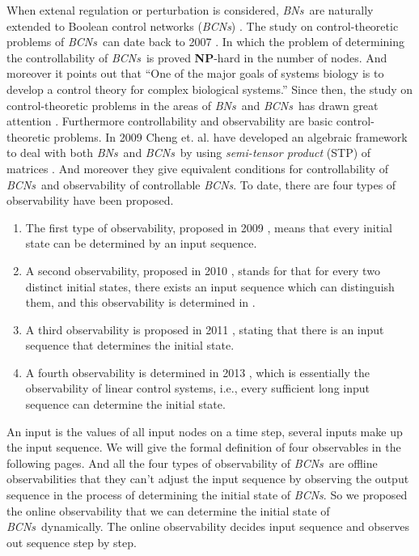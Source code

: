 \documentclass[conference]{IEEEtran} %
\def \BNs {{\em BNs}}
\def \BCNs {{\em BCNs}}
\newcommand{\rev}[1]{{\color{red}{#1}}}
\newcommand{\tl}[1]{\textcolor{blue} {TL: #1 :TL} }
\begin{document}
When extenal regulation or perturbation is considered, \BNs\ are naturally extended to Boolean control networks ({\em BCNs}) \cite{Ideker2001A}. The study on control-theoretic problems of \BCNs\ can date back to 2007 \cite{Akutsu2007Control}. In which the problem of determining the controllability of \BCNs\ is proved {\bf NP}-hard in the number of nodes. And moreover it points out that ``One of the major goals of systems biology is to develop a control theory for complex biological systems.'' Since then, the study on control-theoretic problems in the areas of \BNs\ and \BCNs\ has drawn great attention \cite{Fornasini2013Observability, Zhao2010Input, Cheng2011Identification, Cheng2011Analysis, cheng2009controllability}. Furthermore controllability and observability are basic control-theoretic problems. In 2009 Cheng et. al.   have developed an algebraic framework to deal with both \BNs\ and \BCNs\ by using \emph{semi-tensor product} (STP) of matrices \cite{cheng2009controllability}. And moreover they give equivalent conditions for controllability of \BCNs\ and observability of controllable {\em BCNs}. To date, there are four types of observability have been proposed. 

\begin{enumerate}
	\item The first type of observability, proposed in 2009 \cite{cheng2009controllability}, means that every initial state can be determined by an input sequence.
	
	\item 
	A second observability, proposed in 2010 \cite{Zhao2010Input}, stands for that for every two distinct initial states, there exists an input sequence which can distinguish them, and this observability is determined in \cite{Li2015Controllability}.
	
	\item A third observability is proposed in 2011 \cite{Cheng2011Identification}, stating that there is an input sequence that determines the initial state.
	
	\item  A fourth observability is determined in 2013 \cite{Fornasini2013Observability}, which is essentially the observability of linear control systems, i.e., every sufficient long input sequence can determine the initial state.
\end{enumerate}
 


An input is the values of all input nodes on a time step, several inputs make up the input sequence. We will give the formal definition of four observables in the following pages. And all the four types of observability of \BCNs\ are offline observabilities that they can't adjust the input sequence by observing the output sequence in the process of determining the initial state of {\em BCNs}. So we proposed the online observability that we can determine the initial state of \BCNs\ dynamically. The online observability decides input sequence and observes out sequence step by step.
\end{document}
